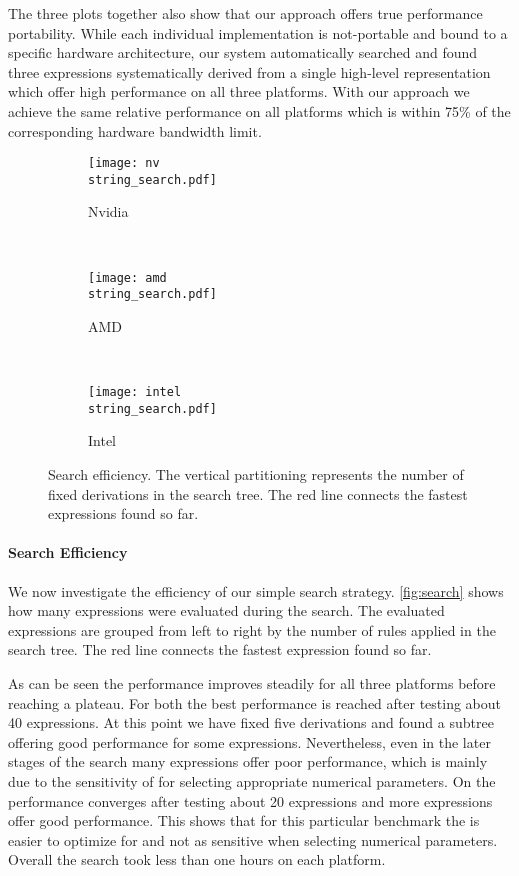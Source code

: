 The three plots together also show that our approach offers true performance portability.
While each individual \BLAS implementation is not-portable and bound to a specific hardware architecture, our system automatically searched and found three expressions systematically derived from a single high-level representation which offer high performance on all three platforms.
With our approach we achieve the same relative performance on all platforms which is within 75\% of the corresponding hardware bandwidth limit.

\begin{figure*}[p]
%
\centering
\begin{subfigure}[b]{0.65\linewidth}
\texttt{[image: nv\\string\_search.pdf]}
\caption{Nvidia \GPU}
\label{fig:search:nv}
\end{subfigure}
\\
%
\begin{subfigure}[b]{0.65\linewidth}
\texttt{[image: amd\\string\_search.pdf]}
\caption{AMD \GPU}
\label{fig:search:amd}
\end{subfigure}
\\
%
\begin{subfigure}[b]{0.65\linewidth}
\texttt{[image: intel\\string\_search.pdf]}
\caption{Intel \CPU}
\label{fig:search:intel}
\end{subfigure}

\caption[Search efficiency of our prototype search tool]{
   Search efficiency.
   The vertical partitioning represents the number of fixed derivations in the search tree.
   The red line connects the fastest expressions found so far.
}
\label{fig:search}
\end{figure*}


\paragraph{Search Efficiency}
We now investigate the efficiency of our simple search strategy.
\autoref{fig:search} shows how many expressions were evaluated during the search.
The evaluated expressions are grouped from left to right by the number of rules applied in the search tree.
The red line connects the fastest expression found so far.

As can be seen the performance improves steadily for all three platforms before reaching a plateau.
For both \GPUs the best performance is reached after testing about 40 expressions.
At this point we have fixed five derivations and found a subtree offering good performance for some expressions.
Nevertheless, even in the later stages of the search many expressions offer poor performance, which is mainly due to the sensitivity of \GPUs for selecting appropriate numerical parameters.
On the \CPU performance converges after testing about 20 expressions and more expressions offer good performance.
This shows that for this particular benchmark the \CPU is easier to optimize for and not as sensitive when selecting numerical parameters.
Overall the search took less than one hours on each platform.

